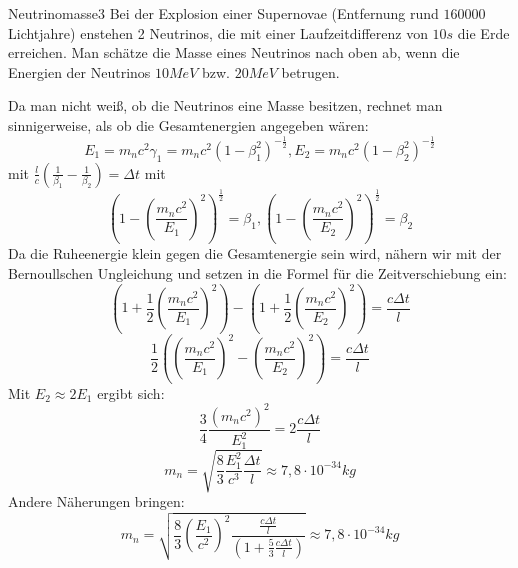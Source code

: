 


\begin{problem}{Neutrinomasse}{3}
Bei der Explosion einer Supernovae (Entfernung rund $160000$ Lichtjahre) enstehen 2 Neutrinos, die mit einer Laufzeitdifferenz von $10\unit{s}$ die Erde erreichen. Man schätze die Masse eines Neutrinos nach oben ab, wenn die Energien der Neutrinos $10\unit{MeV}$ bzw. $20\unit{MeV}$ betrugen.
\begin{solution}
Da man nicht weiß, ob die Neutrinos eine Masse besitzen, rechnet man sinnigerweise, als ob die Gesamtenergien angegeben wären:
$$E_1=m_nc^2\gamma_1=m_nc^2\left(1-\beta_1^2\right)^{-\frac 12}, E_2= m_nc^2\left(1-\beta_2^2\right)^{-\frac 12}$$
mit $\frac lc\left(\frac 1{\beta_1}-\frac 1{\beta_2}\right)=\Delta t$
mit 
$$\left(1-\left(\frac{m_nc^2}{E_1}\right)^2\right)^{\frac 12}=\beta_1, \left(1-\left(\frac{m_nc^2}{E_2}\right)^2\right)^{\frac 12}=\beta_2$$
Da die Ruheenergie klein gegen die Gesamtenergie sein wird, nähern wir mit der Bernoullschen Ungleichung und setzen in die Formel für die Zeitverschiebung ein:
$$\left(1+\frac 12\left(\frac{m_nc^2}{E_1}\right)^2\right)-\left(1+\frac 12\left(\frac{m_nc^2}{E_2}\right)^2\right)=\frac{c\Delta t}{l}$$
$$\frac 12\left(\left(\frac{m_nc^2}{E_1}\right)^2-\left(\frac{m_nc^2}{E_2}\right)^2\right)=\frac{c\Delta t}{l}$$
Mit $E_2\approx 2E_1$ ergibt sich:
$$\frac 34\frac{(m_nc^2)^2}{E_1^2}=2\frac{c\Delta t}l$$
$$m_n=\sqrt{\frac 83 \frac{E_1^2}{c^3}\frac{\Delta t}{l} }\approx 7,8\cdot 10^{-34}\unit{kg}$$
Andere Näherungen bringen:
$$m_n=\sqrt{\frac 83\left(\frac{E_1}{c^2}\right)^2\frac{\frac{c\Delta t}l}{\left( 1+\frac 53 \frac{c\Delta t}{l}\right)}}\approx 7,8\cdot 10^{-34}\unit{kg}$$
\end{solution}
\end{problem}

